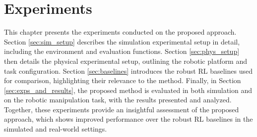 \documentclass[./dissertation.tex]{subfiles}
\begin{document}
\chapter{Experiments}
\label{Experiments}
This chapter presents the experiments conducted on the proposed approach. Section \ref{sec:sim_setup} describes the simulation experimental setup in detail, including the environment and evaluation functions. Section \ref{sec:phys_setup} then details the physical experimental setup, outlining the robotic platform and task configuration. Section \ref{sec:baselines} introduces the robust RL baselines used for comparison, highlighting their relevance to the method. Finally, in Section \ref{sec:exps_and_results}, the proposed method is evaluated in both simulation and on the robotic manipulation task, with the results presented and analyzed. Together, these experiments provide an insightful assessment of the proposed approach, which shows improved performance over the robust RL baselines in the simulated and real-world settings.
\end{document}
